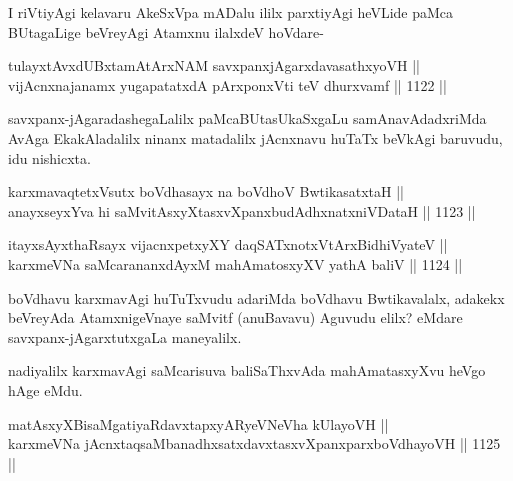 \begin{artha}
I riVtiyAgi kelavaru AkeSxVpa mADalu ililx parxtiyAgi heVLide paMca BUtagaLige beVreyAgi Atamxnu ilalxdeV hoVdare-
\end{artha}

\begin{shl}
tulayxtAvxdUBxtamAtArxNAM savxpanxjAgarxdavasathxyoVH || \\
vijAcnxnajanamx yugapatatxdA pArxponxVti teV dhurxvamf \hfill || 1122 ||  
\end{shl}

\begin{artha}
savxpanx-jAgaradashegaLalilx paMcaBUtasUkaSxgaLu samAnavAdadxriMda 
AvAga EkakAladalilx ninanx matadalilx jAcnxnavu huTaTx beVkAgi baruvudu, idu nishicxta.
\end{artha}


\begin{shl}
karxmavaqtetxVsutx boVdhasayx na boVdhoV BwtikasatxtaH || \\
anayxseyxYva hi saMvitAsxyXtasxvXpanxbudAdhxnatxniVDataH \hfill || 1123 || 
\end{shl}
				
\begin{shl}
itayxsAyxthaRsayx vijacnxpetxyXY daqSATxnotxV\s tArxBidhiVyateV ||  \\
karxmeVNa saMcarananxdAyxM mahAmatosxyXV yathA baliV \hfill || 1124 ||  
\end{shl}

\begin{artha}
boVdhavu karxmavAgi huTuTxvudu adariMda boVdhavu Bwtikavalalx, adakekx beVreyAda AtamxnigeVnaye saMvitf (anuBavavu) Aguvudu elilx? eMdare savxpanx-jAgarxtutxgaLa maneyalilx.
\end{artha}


\begin{artha}
nadiyalilx karxmavAgi saMcarisuva baliSaThxvAda mahAmatasxyXvu heVgo hAge eMdu.
\end{artha}

\begin{shl}
matAsxyXBisaMgatiyaRdavxtapxyARyeVNeVha kUlayoVH || \\
karxmeVNa jAcnxtaqsaMbanadhxsatxdavxtasxvXpanxparxboVdhayoVH \hfill || 1125 ||  
\end{shl}

